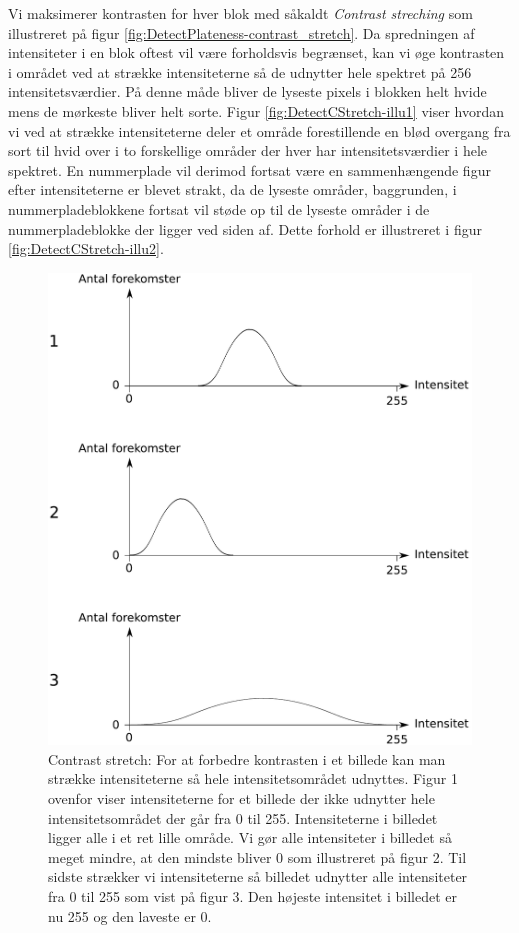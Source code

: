 Vi maksimerer kontrasten for hver blok med såkaldt \textit{Contrast streching} som illustreret på figur \vref{fig:DetectPlateness-contrast_stretch}. Da spredningen af intensiteter i en blok oftest vil være forholdsvis begrænset, kan vi øge kontrasten i området ved at strække intensiteterne så de udnytter hele spektret på 256 intensitetsværdier. På denne måde bliver de lyseste pixels i blokken helt hvide  mens de mørkeste bliver helt sorte. Figur \vref{fig:DetectCStretch-illu1} viser hvordan vi ved at strække intensiteterne deler et område forestillende en blød overgang fra sort til hvid over i to forskellige områder der hver har intensitetsværdier i hele spektret. En nummerplade vil derimod fortsat være en sammenhængende figur efter intensiteterne er blevet strakt, da de lyseste områder, baggrunden, i nummerpladeblokkene fortsat vil støde op til de lyseste områder i de nummerpladeblokke der ligger ved siden af. Dette forhold er illustreret i figur \vref{fig:DetectCStretch-illu2}.


\begin{figure}[htp]
  \centering
  \includegraphics[width=12cm]{system/illu/contrast_stretch.pdf} 
  \caption{Contrast stretch: For at forbedre kontrasten i et billede kan man strække intensiteterne så hele intensitetsområdet udnyttes. Figur 1 ovenfor viser intensiteterne for et billede der ikke udnytter hele intensitetsområdet der går fra 0 til 255. Intensiteterne i billedet ligger alle i et ret lille område. Vi gør alle intensiteter i billedet så meget mindre, at den mindste bliver 0 som illustreret på figur 2. Til sidste strækker vi intensiteterne så billedet udnytter alle intensiteter fra 0 til 255 som vist på figur 3. Den højeste intensitet i billedet er nu 255 og den laveste er 0.}
  \label{fig:DetectPlateness-contrast_stretch}
\end{figure}



